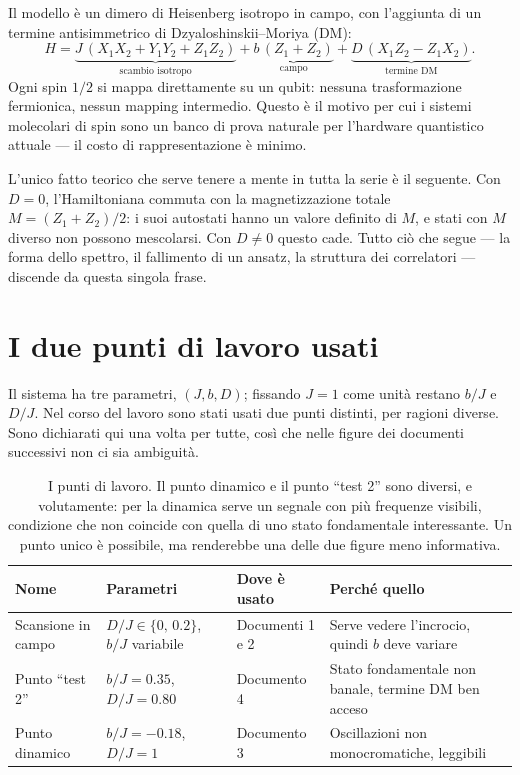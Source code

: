 \documentclass[11pt,a4paper]{article}
\begin{document}
Il modello è un dimero di Heisenberg isotropo in campo, con l'aggiunta di un
termine antisimmetrico di Dzyaloshinskii--Moriya (DM):
\begin{equation}
H = \underbrace{J\,(X_1X_2+Y_1Y_2+Z_1Z_2)}_{\text{scambio isotropo}}
  + \underbrace{b\,(Z_1+Z_2)}_{\text{campo}}
  + \underbrace{D\,(X_1Z_2-Z_1X_2)}_{\text{termine DM}}.
\label{eq:H}
\end{equation}
Ogni spin $1/2$ si mappa direttamente su un qubit: nessuna trasformazione
fermionica, nessun mapping intermedio. Questo è il motivo per cui i sistemi
molecolari di spin sono un banco di prova naturale per l'hardware quantistico
attuale --- il costo di rappresentazione è minimo.

L'unico fatto teorico che serve tenere a mente in tutta la serie è il seguente.
Con $D=0$, l'Hamiltoniana commuta con la magnetizzazione totale
$M=(Z_1+Z_2)/2$: i suoi autostati hanno un valore definito di $M$, e stati con
$M$ diverso non possono mescolarsi. Con $D\neq0$ questo cade. Tutto ciò che
segue --- la forma dello spettro, il fallimento di un ansatz, la struttura dei
correlatori --- discende da questa singola frase.


\section{I due punti di lavoro usati}

Il sistema ha tre parametri, $(J,b,D)$; fissando $J=1$ come unità restano
$b/J$ e $D/J$. Nel corso del lavoro sono stati usati due punti distinti, per
ragioni diverse. Sono dichiarati qui una volta per tutte, così che nelle figure
dei documenti successivi non ci sia ambiguità.

\begin{table}[htbp]
\centering
\footnotesize
\renewcommand{\arraystretch}{1.35}
\begin{tabular}{@{}p{2.9cm}p{3.4cm}p{2.4cm}p{5.6cm}@{}}
\toprule
\rowcolor{grigetto}
\textbf{Nome} & \textbf{Parametri} & \textbf{Dove è usato} & \textbf{Perché quello} \\
\midrule
Scansione in campo & $D/J\in\{0,\,0.2\}$, $b/J$ variabile
  & Documenti 1 e 2 & Serve vedere l'incrocio, quindi $b$ deve variare \\
Punto ``test 2'' & $b/J=0.35$, $D/J=0.80$
  & Documento 4 & Stato fondamentale non banale, termine DM ben acceso \\
Punto dinamico & $b/J=-0.18$, $D/J=1$
  & Documento 3 & Oscillazioni non monocromatiche, leggibili \\
\bottomrule
\end{tabular}
\caption{I punti di lavoro. Il punto dinamico e il punto ``test 2'' sono
diversi, e volutamente: per la dinamica serve un segnale con più frequenze
visibili, condizione che non coincide con quella di uno stato fondamentale
interessante. Un punto unico è possibile, ma renderebbe una delle due figure
meno informativa.}
\end{table}
\end{document}
